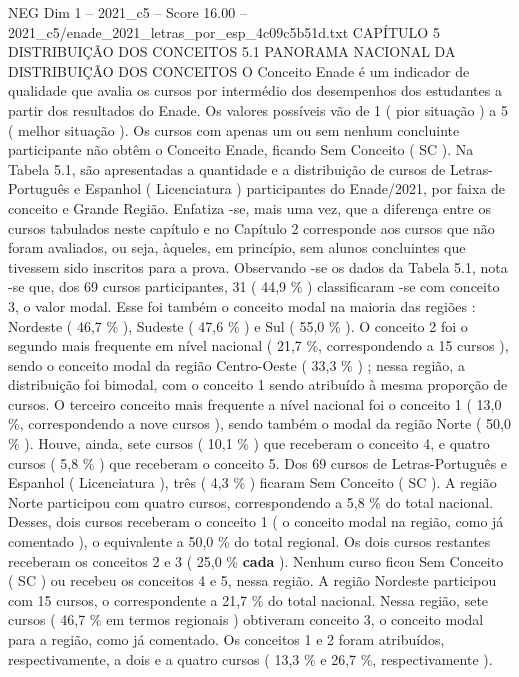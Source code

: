 \begin{textsample}{NEG Dim 1 – 2021\_c5 – Score 16.00 – 2021\_c5/enade\_2021\_letras\_por\_esp\_4c09c5b51d.txt}  \label{ex:f1_neg_401}
CAPÍTULO 5 DISTRIBUIÇÃO DOS CONCEITOS 5.1 PANORAMA NACIONAL DA DISTRIBUIÇÃO DOS CONCEITOS O Conceito Enade é um indicador de qualidade que avalia os cursos por intermédio dos desempenhos dos estudantes a partir dos resultados do Enade.
Os valores possíveis vão de 1 ( pior situação ) a 5 ( melhor situação ).
Os cursos com apenas um ou sem nenhum concluinte participante não obtêm o Conceito Enade, ficando Sem Conceito ( SC ).
Na Tabela 5.1, são apresentadas a quantidade e a distribuição de cursos de Letras-Português e Espanhol ( Licenciatura ) participantes do Enade/2021, por faixa de conceito e Grande Região.
Enfatiza -se, mais uma vez, que a diferença entre os cursos tabulados neste capítulo e no Capítulo 2 corresponde aos cursos que não foram avaliados, ou seja, àqueles, em princípio, sem alunos concluintes que tivessem sido inscritos para a prova.
Observando -se os dados da Tabela 5.1, nota -se que, dos 69 cursos participantes, 31 ( 44,9 \% ) classificaram -se com conceito 3, o valor modal.
Esse foi também o conceito modal na maioria das regiões : Nordeste ( 46,7 \% ), Sudeste ( 47,6 \% ) e Sul ( 55,0 \% ).
O conceito 2 foi o segundo mais frequente em nível nacional ( 21,7 \%, correspondendo a 15 cursos ), sendo o conceito modal da região Centro-Oeste ( 33,3 \% ) ; nessa região, a distribuição foi bimodal, com o conceito 1 sendo atribuído à mesma proporção de cursos.
O terceiro conceito mais frequente a nível nacional foi o conceito 1 ( 13,0 \%, correspondendo a nove cursos ), sendo também o modal da região Norte ( 50,0 \% ).
Houve, ainda, sete cursos ( 10,1 \% ) que receberam o conceito 4, e quatro cursos ( 5,8 \% ) que receberam o conceito 5.
Dos 69 cursos de Letras-Português e Espanhol ( Licenciatura ), três ( 4,3 \% ) ficaram Sem Conceito ( SC ).
A região Norte participou com quatro cursos, correspondendo a 5,8 \% do total nacional.
Desses, dois cursos receberam o conceito 1 ( o conceito modal na região, como já comentado ), o equivalente a 50,0 \% do total regional.
Os dois cursos restantes receberam os conceitos 2 e 3 ( 25,0 \% \textbf{cada} ).
Nenhum curso ficou Sem Conceito ( SC ) ou recebeu os conceitos 4 e 5, nessa região.
A região Nordeste participou com 15 cursos, o correspondente a 21,7 \% do total nacional.
Nessa região, sete cursos ( 46,7 \% em termos regionais ) obtiveram conceito 3, o conceito modal para a região, como já comentado.
Os conceitos 1 e 2 foram atribuídos, respectivamente, a dois e a quatro cursos ( 13,3 \% e 26,7 \%, respectivamente ).

\end{textsample}
